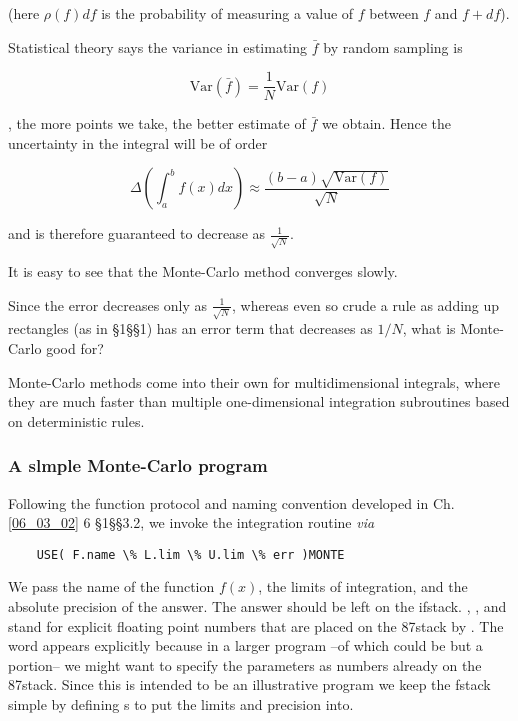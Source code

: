 (here $\rho(f)df$ is the probability of measuring a value of $f$ between $f$ and $f + df$).

Statistical theory says the variance in estimating $\bar{f}$ by random sampling is

\begin{equation}
\text{Var}(\bar{f}) = \frac{1}{N} \text{Var}(f)
\end{equation}

\ie, the more points we take, the better estimate of $\bar{f}$ we obtain. Hence the uncertainty in the integral will be of order

\begin{equation}
\Delta \left(\int_{a}^{b}f(x)dx\right) \approx \frac{(b-a)\sqrt{\text{Var}(f)}}{\sqrt{N}}
\end{equation}

and is therefore guaranteed to decrease as $\frac{1}{\sqrt{N}}$.

It is easy to see that the Monte-Carlo method converges slowly.

Since the error decreases only as $\frac{1}{\sqrt{N}}$, whereas even so crude a rule as adding up rectangles (as in \S1\S\S1) has an error term that decreases as $1/N$, what is Monte-Carlo good for?

Monte-Carlo methods come into their own for multidimensional integrals, where they are much faster than multiple one-dimensional integration subroutines based on deterministic rules.

\subsubsection{A slmple Monte-Carlo program}
Following the function protocol and naming convention developed in Ch. \ref{06_03_02} 6 \S1\S\S3.2, we invoke the integration routine \textit{via}

\begin{lstlisting}
    USE( F.name \% L.lim \% U.lim \% err )MONTE
\end{lstlisting}

We pass  the name  of the function $f(x)$, the limits of integration, and the absolute precision of the answer. The answer should be left on the ifstack. , , and  stand for explicit ﬂoating point numbers that are placed on the 87stack by \bc{\%}. The word \bc{\%} appears explicitly because in a larger program --of which  could be but a portion-- we might want to specify the parameters as numbers already on the 87stack. Since this is intended to be an illustrative program we keep the fstack simple by defining s to put the limits and precision into.

